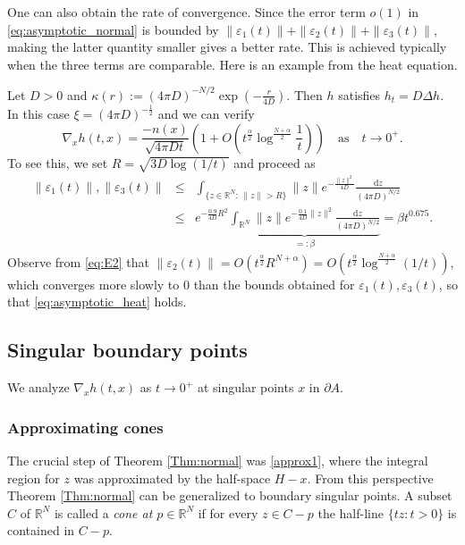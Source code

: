 \documentclass[graybox]{svmult}
\newcommand{\ep}{\varepsilon}
\renewcommand{\d}{\mathrm{d}}  %
\newcommand{\R}{\mathbb{R}}  %
\renewcommand{\AA}{A}  %
\newcommand{\pp}{p}
\begin{document}
One can also obtain the rate of convergence. Since the error term $o(1)$ in \eqref{eq:asymptotic_normal} is bounded by $\|\ep_1(t)\| +\|\ep_2(t)\| +\|\ep_3(t)\|$, making the latter quantity smaller gives a better rate. This is achieved typically when the three terms are comparable.  Here is an example from the heat equation. 
\begin{example}
Let $D>0$ and $\kappa(r) := (4\pi D)^{-N/2}\exp(-\frac{r}{4D})$. Then $h$ satisfies $h_t=D\Delta h$. In this case $\xi=(4\pi D)^{-\frac{1}{2}}$ and we can verify 
\begin{equation}\label{eq:asymptotic_heat}
\nabla_x h(t,x) = \frac{-n(x)}{\sqrt{4\pi Dt}} \left(1+O\left(t^{\frac{\alpha}{2}}\log^{\frac{N+\alpha}{2}}\frac1{t}\right) \right) \quad  \text{as}\quad t\to 0^+. 
\end{equation}
To see this, we set $R=\sqrt{3D\log (1/t)}$ and proceed as 
\begin{eqnarray*}
\|\ep_1(t)\|, \|\ep_3(t)\| &\le & \int_{\{z\in\R^N:\, \|z\|>R\}} \|z\| e^{-\frac{\|z\|^2}{4D}}\frac{\d z}{(4\pi D)^{N/2}}  \\
&\le& e^{-\frac{0.9}{4D}R^2} \underbrace{\int_{\R^N} \|z\| e^{-\frac{0.1}{4D}\|z\|^2}\frac{\d z}{(4\pi D)^{N/2}}}_{=:\beta} =  \beta t^{0.675}. 
\end{eqnarray*}
Observe from \eqref{eq:E2} that $\|\ep_2(t)\| = O(t^{\frac{\alpha}{2}}R^{N+\alpha})=O(t^{\frac{\alpha}{2}}\log^{\frac{N+\alpha}{2}}(1/t))$, which  converges more slowly to $0$ than the bounds obtained for $\ep_1(t),\ep_3(t)$, so that \eqref{eq:asymptotic_heat} holds. 
\end{example}







\subsection{Singular boundary points}\label{sec3.2}




We analyze $\nabla_x h(t,x)$ as $t\to0^+$ at singular points $x$ in $\partial\AA$. 


\subsubsection{Approximating cones}

The crucial step of Theorem \ref{Thm:normal}  was \eqref{approx1}, where the integral region for $z$ was approximated by the half-space $H-x$. From this perspective Theorem \ref{Thm:normal} can be generalized to boundary singular points. A  subset $C$ of $\R^N$ is called a \emph{cone at $\pp\in \R^N$} if for every $z \in C -\pp$ the half-line $\{t z: t>0\}$ is contained in $C-\pp$. 
\end{document}
